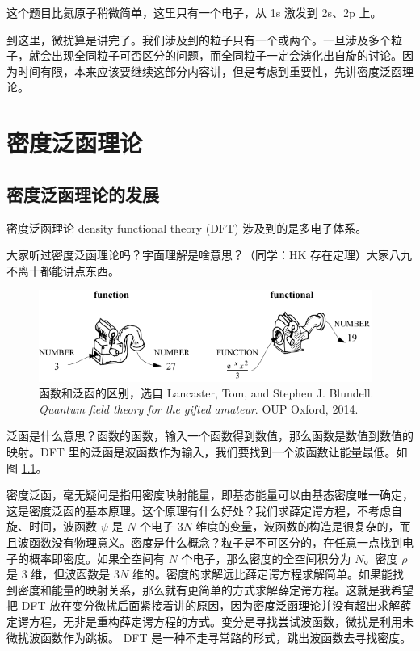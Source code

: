 这个题目比氦原子稍微简单，这里只有一个电子，从 1s 激发到 2s、2p 上。

到这里，微扰算是讲完了。我们涉及到的粒子只有一个或两个。一旦涉及多个粒子，就会出现全同粒子可否区分的问题，而全同粒子一定会演化出自旋的讨论。因为时间有限，本来应该要继续这部分内容讲，但是考虑到重要性，先讲密度泛函理论。

\chapter{密度泛函理论}
\section{密度泛函理论的发展}
密度泛函理论 density functional theory (DFT) 涉及到的是多电子体系。

大家听过密度泛函理论吗？字面理解是啥意思？（同学：HK 存在定理）大家八九不离十都能讲点东西。

\begin{figure}[tp]
    \centering
    \includegraphics[height=3cm]{fig/fct_fctn.pdf} 
    \caption{函数和泛函的区别，选自 Lancaster, Tom, and Stephen J. Blundell. \emph{Quantum field theory for the gifted amateur}. OUP Oxford, 2014.}
    \label{fig:function_vs_fuctional}
\end{figure}
泛函是什么意思？函数的函数，输入一个函数得到数值，那么函数是数值到数值的映射。DFT 里的泛函是波函数作为输入，我们要找到一个波函数让能量最低。如图 \ref{fig:function_vs_fuctional}。

密度泛函，毫无疑问是指用密度映射能量，即基态能量可以由基态密度唯一确定，这是密度泛函的基本原理。这个原理有什么好处？我们求薛定谔方程，不考虑自旋、时间，波函数 $\psi$ 是 $N$ 个电子 $3N$ 维度的变量，波函数的构造是很复杂的，而且波函数没有物理意义。密度是什么概念？粒子是不可区分的，在任意一点找到电子的概率即密度。如果全空间有 $N$ 个电子，那么密度的全空间积分为 $N$。密度 $\rho$ 是 3 维，但波函数是 $3N$ 维的。密度的求解远比薛定谔方程求解简单。如果能找到密度和能量的映射关系，那么就有更简单的方式求解薛定谔方程。这就是我希望把 DFT 放在变分微扰后面紧接着讲的原因，因为密度泛函理论并没有超出求解薛定谔方程，无非是重构薛定谔方程的方式。变分是寻找尝试波函数，微扰是利用未微扰波函数作为跳板。
DFT 是一种不走寻常路的形式，跳出波函数去寻找密度。

